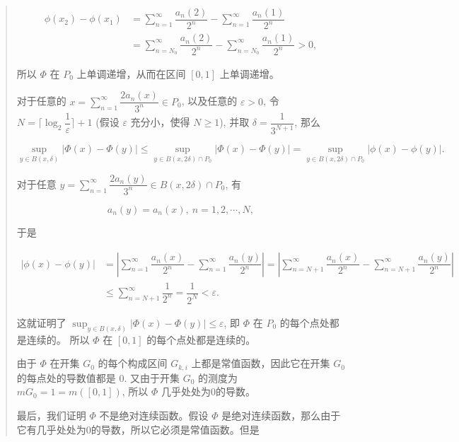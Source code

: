 \documentclass[
]{article}
\begin{document}
\begin{quote}
\[\begin{aligned}
\phi(x_2) - \phi(x_1) & = \sum\limits_{n=1}^{\infty} \dfrac{a_n(2)}{2^n} - \sum\limits_{n=1}^{\infty} \dfrac{a_n(1)}{2^n} \\
& = \sum\limits_{n=N_0}^{\infty} \dfrac{a_n(2)}{2^n} - \sum\limits_{n=N_0}^{\infty} \dfrac{a_n(1)}{2^n} > 0,
\end{aligned}\]

所以 \(\Phi\) 在 \(P_0\) 上单调递增，从而在区间 \([0, 1]\) 上单调递增。

对于任意的
\(\displaystyle x = \sum\limits_{n=1}^{\infty} \dfrac{2a_n(x)}{3^n} \in P_0\),
以及任意的 \(\varepsilon > 0\), 令
\(N = \lceil \log_2 \dfrac{1}{\varepsilon} \rceil + 1\) (假设
\(\varepsilon\) 充分小，使得 \(N \geqslant 1\)), 并取
\(\delta = \dfrac{1}{3^{N+1}}\), 那么

\[\sup_{y \in B(x, \delta)} \lvert \Phi(x) - \Phi(y) \rvert \leqslant \sup_{y \in B(x, 2\delta) \cap P_0} \lvert \Phi(x) - \Phi(y) \rvert = \sup_{y \in B(x, 2\delta) \cap P_0} \lvert \phi(x) - \phi(y) \rvert.\]

对于任意
\(\displaystyle y = \sum\limits_{n=1}^{\infty} \dfrac{2a_n(y)}{3^n} \in B(x, 2\delta) \cap P_0\),
有

\[a_n(y) = a_n(x), ~ n = 1, 2, \cdots, N,\]

于是

\[\begin{aligned}
\lvert \phi(x) - \phi(y) \rvert & = \left\lvert \sum\limits_{n=1}^{\infty} \dfrac{a_n(x)}{2^n} - \sum\limits_{n=1}^{\infty} \dfrac{a_n(y)}{2^n} \right\rvert = \left\lvert \sum\limits_{n=N+1}^{\infty} \dfrac{a_n(x)}{2^n} - \sum\limits_{n=N+1}^{\infty} \dfrac{a_n(y)}{2^n} \right\rvert \\
& \leqslant \sum\limits_{n=N+1}^{\infty} \dfrac{1}{2^n} = \dfrac{1}{2^{N}} < \varepsilon.
\end{aligned}\]

这就证明了
\(\displaystyle \sup_{y \in B(x, \delta)} \lvert \Phi(x) - \Phi(y) \rvert \leqslant \varepsilon\),
即 \(\Phi\) 在 \(P_0\) 的每个点处都是连续的。 所以 \(\Phi\) 在
\([0, 1]\) 的每个点处都是连续的。

由于 \(\Phi\) 在开集 \(G_0\) 的每个构成区间 \(G_{k, i}\)
上都是常值函数，因此它在开集 \(G_0\) 的每点处的导数值都是 \(0\).
又由于开集 \(G_0\) 的测度为 \(m G_0 = 1 = m ([0, 1])\), 所以 \(\Phi\)
几乎处处为0的导数。

最后，我们证明 \(\Phi\) 不是绝对连续函数。假设 \(\Phi\)
是绝对连续函数，那么由于它有几乎处处为0的导数，所以它必须是常值函数。但是


\end{quote}
\end{document}
